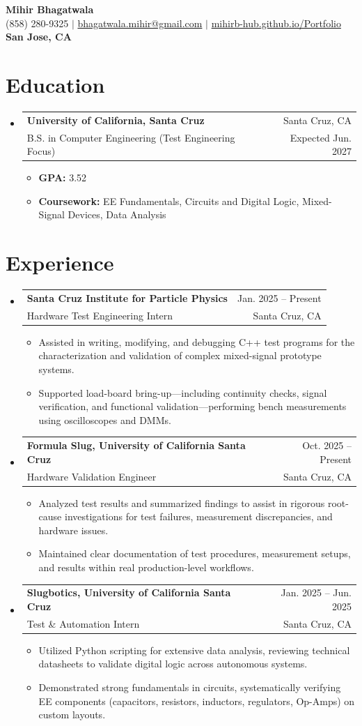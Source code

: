 \documentclass[letterpaper,11pt]{article}
\makeatletter
\newcommand{\resumeItem}[1]{\item{#1}}
\newcommand{\resumeSubheading}[4]{
  \item
    \begin{tabular*}{0.97\textwidth}[t]{l@{\extracolsep{\fill}}r}
      \textbf{#1} & #2 \\
      #3 & #4 \\
    \end{tabular*}
}
\newcommand{\resumeSubHeadingListStart}{\begin{itemize}[label=\textbullet]}
\newcommand{\resumeSubHeadingListEnd}{\end{itemize}}
\newcommand{\resumeItemListStart}{\begin{itemize}[label=-]}
\newcommand{\resumeItemListEnd}{\end{itemize}}
\makeatother
\begin{document}
\begin{center}
  {\Large\bfseries Mihir Bhagatwala} \\
  {(858) 280-9325 $\vert$ \href{mailto:bhagatwala.mihir@gmail.com}{bhagatwala.mihir@gmail.com} $\vert$ \href{https://mihirb-hub.github.io/Portfolio/}{mihirb-hub.github.io/Portfolio}} \\
  {\textbf{San Jose, CA}}
\end{center}

\section{Education}
\resumeSubHeadingListStart
  \resumeSubheading{University of California, Santa Cruz}{Santa Cruz, CA}{B.S. in Computer Engineering (Test Engineering Focus)}{Expected Jun. 2027}
  \resumeItemListStart
    \resumeItem{\textbf{GPA:} 3.52}
    \resumeItem{\textbf{Coursework:} EE Fundamentals, Circuits and Digital Logic, Mixed-Signal Devices, Data Analysis}
  \resumeItemListEnd
\resumeSubHeadingListEnd

\section{Experience}
\resumeSubHeadingListStart
  \resumeSubheading{Santa Cruz Institute for Particle Physics}{Jan. 2025 -- Present}{Hardware Test Engineering Intern}{Santa Cruz, CA}
  \resumeItemListStart
    \resumeItem{Assisted in writing, modifying, and debugging C++ test programs for the characterization and validation of complex mixed-signal prototype systems.}
    \resumeItem{Supported load-board bring-up—including continuity checks, signal verification, and functional validation—performing bench measurements using oscilloscopes and DMMs.}
  \resumeItemListEnd

  \resumeSubheading{Formula Slug, University of California Santa Cruz}{Oct. 2025 -- Present}{Hardware Validation Engineer}{Santa Cruz, CA}
  \resumeItemListStart
    \resumeItem{Analyzed test results and summarized findings to assist in rigorous root-cause investigations for test failures, measurement discrepancies, and hardware issues.}
    \resumeItem{Maintained clear documentation of test procedures, measurement setups, and results within real production-level workflows.}
  \resumeItemListEnd

  \resumeSubheading{Slugbotics, University of California Santa Cruz}{Jan. 2025 -- Jun. 2025}{Test \& Automation Intern}{Santa Cruz, CA}
  \resumeItemListStart
    \resumeItem{Utilized Python scripting for extensive data analysis, reviewing technical datasheets to validate digital logic across autonomous systems.}
    \resumeItem{Demonstrated strong fundamentals in circuits, systematically verifying EE components (capacitors, resistors, inductors, regulators, Op-Amps) on custom layouts.}
  \resumeItemListEnd
\resumeSubHeadingListEnd
\end{document}
